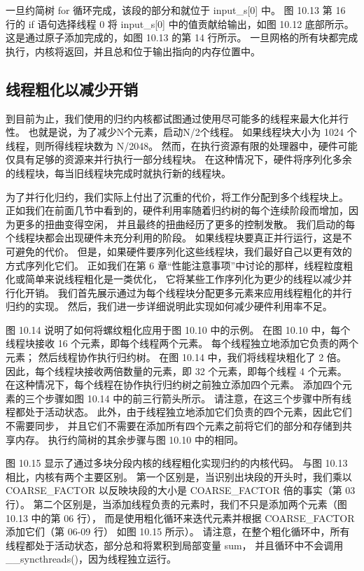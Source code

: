 一旦约简树 for 循环完成，该段的部分和就位于 input\_s[0] 中。 
图 10.13 第 16 行的 if 语句选择线程 0 将 input\_s[0] 中的值贡献给输出，如图 10.12 底部所示。 
这是通过原子添加完成的，如图 10.13 的第 14 行所示。 
一旦网格的所有块都完成执行，内核将返回，并且总和位于输出指向的内存位置中。

\subsection{线程粗化以减少开销}
到目前为止，我们使用的归约内核都试图通过使用尽可能多的线程来最大化并行性。 
也就是说，为了减少N个元素，启动N/2个线程。 如果线程块大小为 1024 个线程，则所得线程块数为 N/2048。 
然而，在执行资源有限的处理器中，硬件可能仅具有足够的资源来并行执行一部分线程块。 
在这种情况下，硬件将序列化多余的线程块，每当旧线程块完成时就执行新的线程块。

为了并行化归约，我们实际上付出了沉重的代价，将工作分配到多个线程块上。 
正如我们在前面几节中看到的，硬件利用率随着归约树的每个连续阶段而增加，因为更多的扭曲变得空闲，
并且最终的扭曲经历了更多的控制发散。 我们启动的每个线程块都会出现硬件未充分利用的阶段。 
如果线程块要真正并行运行，这是不可避免的代价。 但是，如果硬件要序列化这些线程块，我们最好自己以更有效的方式序列化它们。 
正如我们在第 6 章“性能注意事项”中讨论的那样，线程粒度粗化或简单来说线程粗化是一类优化，
它将某些工作序列化为更少的线程以减少并行化开销。 我们首先展示通过为每个线程块分配更多元素来应用线程粗化的并行归约的实现。 
然后，我们进一步详细说明此实现如何减少硬件利用率不足。

图 10.14 说明了如何将螺纹粗化应用于图 10.10 中的示例。 在图 10.10 中，每个线程块接收 16 个元素，即每个线程两个元素。 
每个线程独立地添加它负责的两个元素； 然后线程协作执行归约树。 在图 10.14 中，我们将线程块粗化了 2 倍。
因此，每个线程块接收两倍数量的元素，即 32 个元素，即每个线程 4 个元素。 
在这种情况下，每个线程在协作执行归约树之前独立添加四个元素。 添加四个元素的三个步骤如图 10.14 中的前三行箭头所示。 
请注意，在这三个步骤中所有线程都处于活动状态。 
此外，由于线程独立地添加它们负责的四个元素，因此它们不需要同步，
并且它们不需要在添加所有四个元素之前将它们的部分和存储到共享内存。 执行约简树的其余步骤与图 10.10 中的相同。

图 10.15 显示了通过多块分段内核的线程粗化实现归约的内核代码。 与图 10.13 相比，内核有两个主要区别。 
第一个区别是，当识别出块段的开头时，我们乘以 COARSE\_FACTOR 以反映块段的大小是 COARSE\_FACTOR 倍的事实（第 03 行）。 
第二个区别是，当添加线程负责的元素时，我们不只是添加两个元素（图 10.13 中的第 06 行），
而是使用粗化循环来迭代元素并根据 COARSE\_FACTOR 添加它们（第 06-09 行） 如图 10.15 所示）。 
请注意，在整个粗化循环中，所有线程都处于活动状态，部分总和将累积到局部变量 sum，
并且循环中不会调用 \_\_syncthreads()，因为线程独立运行。

